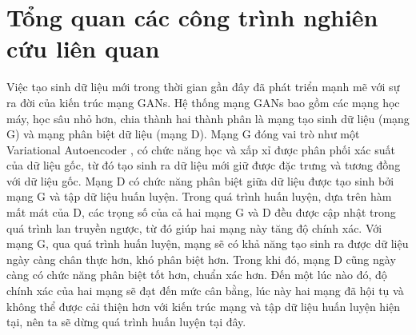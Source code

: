 \section{\texorpdfstring{Tổng quan các công trình nghiên cứu liên quan}{Content}}
Việc tạo sinh dữ liệu mới trong thời gian gần đây đã phát triển mạnh mẽ với sự ra đời của kiến trúc mạng GANs. Hệ thống mạng GANs bao gồm các mạng học máy, học sâu nhỏ hơn, chia thành hai thành phân là mạng tạo sinh dữ liệu (mạng G) và mạng phân biệt dữ liệu (mạng D). Mạng G đóng vai trò như một Variational Autoencoder \cite{vae_base},  có chức năng học và xấp xỉ được phân phối xác suất của dữ liệu gốc, từ đó tạo sinh ra dữ liệu mới giữ được đặc trưng và tương đồng với dữ liệu gốc. Mạng D có chức năng phân biệt giữa dữ liệu được tạo sinh bởi mạng G và tập dữ liệu huấn luyện. Trong quá trình huấn luyện, dựa trên hàm mất mát của D, các trọng số của cả hai mạng G và D đều được cập nhật trong quá trình lan truyền ngược, từ đó giúp hai mạng này tăng độ chính xác. Với mạng G, qua quá trình huấn luyện, mạng sẽ có khả năng tạo sinh ra được dữ liệu ngày càng chân thực hơn, khó phân biệt hơn. Trong khi đó, mạng D cũng ngày càng có chức năng phân biệt tốt hơn, chuẩn xác hơn. Đến một lúc nào đó, độ chính xác của hai mạng sẽ đạt đến mức cân bằng, lúc này hai mạng đã hội tụ và không thể được cải thiện hơn với kiến trúc mạng và tập dữ liệu huấn luyện hiện tại, nên ta sẽ dừng quá trình huấn luyện tại đây.